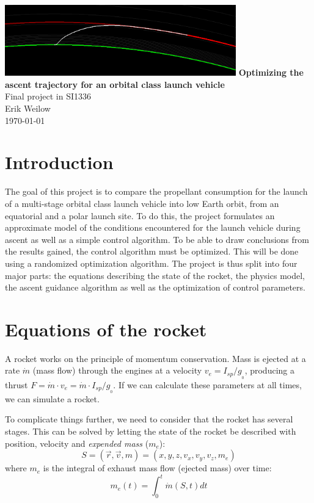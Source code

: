 \documentclass[11pt]{article}
\begin{document}
\begin{titlepage}
  \centering
  \vfill
  \vfill
  \includegraphics[width=0.75\textwidth]{./220km.png}
  \vskip3cm
  {\Large
  \textbf{Optimizing the ascent trajectory for an orbital class launch vehicle}\\
  \vskip0.25cm
  Final project in SI1336\\
      \vskip1cm
      Erik Weilow\\
      \vskip0.5cm
      \today\\
  }    
  \vfill
  \vfill
\end{titlepage}
\newpage

\section{Introduction}
The goal of this project is to compare the propellant consumption for the launch of a multi-stage orbital class launch vehicle into low Earth orbit, from an equatorial and a polar launch site.
To do this, the project formulates an approximate model of the conditions encountered for the launch vehicle during ascent as well as a simple control algorithm.
To be able to draw conclusions from the results gained, the control algorithm must be optimized. 
This will be done using a randomized optimization algorithm.
The project is thus split into four major parts: the equations describing the state of the rocket, the physics model, the ascent guidance algorithm as well as the optimization of control parameters.

\section{Equations of the rocket}
A rocket works on the principle of momentum conservation. Mass is ejected at a rate $\dot{m}$ (mass flow) through the engines at a velocity $v_{e} = I_{sp} / g_{_0}$, 
producing a thrust $F = \dot{m} \cdot v_{e} = \dot{m} \cdot I_{sp} / g_{_0}$. If we can calculate these parameters at all times, we can simulate a rocket.

To complicate things further, we need to consider that the rocket has several stages.
This can be solved by letting the state of the rocket be described with position, velocity and \textit{expended mass} ($m_e$):
$$
S = (\vec{r}, \vec{v}, m) = (x, y, z, v_x, v_y, v_z, m_e)
$$
where $m_e$ is the integral of exhaust mass flow (ejected mass) over time:
$$
m_e(t) = \int_0^t \dot{m}(S,t) dt
$$
\end{document}
